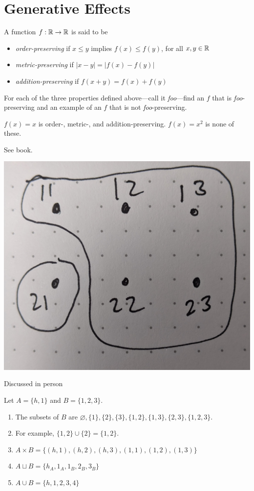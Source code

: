 \chapter{Generative Effects}

A function $f:\mathbb{R}\to\mathbb{R}$ is said to be
\begin{itemize}
    \item \emph{order-preserving} if $x \leq y$ implies $f(x) \leq f(y)$, for all $x, y \in \mathbb{R}$
    \item \emph{metric-preserving} if $|x-y|=|f(x)-f(y)|$
    \item \emph{addition-preserving} if $f(x+y)=f(x)+f(y)$
\end{itemize}
For each of the three properties defined above—call it \emph{foo}—find an $f$ that is \emph{foo}-preserving and an example of an $f$ that is not \emph{foo}-preserving.

\solution
$f(x) = x$ is order-, metric-, and addition-preserving.  $f(x) = x^2$ is none of these.

See book.

\solution
\includegraphics[width=0.5\linewidth]{images/1-4.jpg}

Discussed in person

Let $A = \{h, 1\}$ and $B = \{1, 2, 3\}$.

\solution
\begin{enumerate}
    \item The subsets of $B$ are $\varnothing, \{1\}, \{2\}, \{3\}, \{1, 2\}, \{1, 3\}, \{2, 3\}, \{1,2,3\}$.
    \item For example, $\{1, 2\} \cup \{2\} = \{1, 2\}$.
    \item $A\times B = \{(h, 1), (h, 2), (h, 3), (1, 1), (1, 2), (1, 3)\}$
    \item $A\sqcup B = \{h_A, 1_A, 1_B, 2_B, 3_B\}$
    \item $A\cup B = \{h, 1, 2, 3, 4\}$
\end{enumerate}

